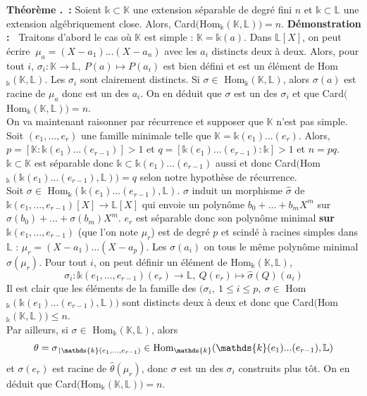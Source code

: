 \documentclass[5pt,a4paper]{article}
\newcounter{thm}[section]
\renewcommand{\thethm}{\thesection.\arabic{thm}}
\newcommand{\thm}[1]{\stepcounter{thm}\noindent\textbf{Théorème \thethm ~:} #1 \newline}
\newcommand{\demo}[1]{\textbf{Démonstration :~} #1 \newline}
\def\restriction#1#2{\mathchoice
              {\setbox1\hbox{${\displaystyle #1}_{\scriptstyle #2}$}
              \restrictionaux{#1}{#2}}
              {\setbox1\hbox{${\textstyle #1}_{\scriptstyle #2}$}
              \restrictionaux{#1}{#2}}
              {\setbox1\hbox{${\scriptstyle #1}_{\scriptscriptstyle #2}$}
              \restrictionaux{#1}{#2}}
              {\setbox1\hbox{${\scriptscriptstyle #1}_{\scriptscriptstyle #2}$}
              \restrictionaux{#1}{#2}}}
\def\restrictionaux#1#2{{#1\,\smash{\vrule height .8\ht1 depth .85\dp1}}_{\,#2}}
\begin{document}
\begin{onehalfspacing}
\thm{Soient $\mathds{k} \subset \mathbb{K}$ une extension séparable de degré fini $n$ et $\mathds{k} \subset \mathbb{L}$ une extension algébriquement close. Alors, Card$($Hom$_{\mathds{k}}(\mathbb{K}, \mathbb{L})) = n$.}
\demo{Traitons d'abord le cas où $\mathbb{K}$ est simple : $\mathbb{K} = \mathds{k}(a)$. Dans $\mathbb{L}[X]$, on peut écrire $~\mu_a = (X - a_1)...(X - a_n)$ avec les $a_i$ distincts deux à deux. Alors, pour tout $i$, $\sigma_i : \mathbb{K} \rightarrow \mathbb{L},~P(a) \mapsto P(a_i)$ est bien défini et est un élément de Hom$_{\mathds{k}}(\mathbb{K}, \mathbb{L})$. Les $\sigma_i$ sont clairement distincts. Si $\sigma \in $ Hom$_{\mathds{k}}(\mathbb{K}, \mathbb{L})$, alors $\sigma(a)$ est racine de $\mu_a$ donc est un des $a_i$. On en déduit que $\sigma$ est un des $\sigma_i$ et que Card$($Hom$_{\mathds{k}}(\mathbb{K}, \mathbb{L})) = n$. 
\\On va maintenant raisonner par récurrence et supposer que $\mathbb{K}$ n'est pas simple. Soit $(e_1, ..., e_r)$ une famille minimale telle que $\mathbb{K} = \mathds{k}(e_1)...(e_r)$. Alors, $p = [\mathbb{K} : \mathds{k}(e_1)...(e_{r-1})] > 1$ et $q = [\mathds{k}(e_1)...(e_{r-1}) : \mathds{k}] > 1$ et $n = pq$. 
\\$\mathds{k} \subset \mathbb{K}$ est séparable donc $\mathds{k} \subset \mathds{k}(e_1)...(e_{r-1})$ aussi et donc Card$($Hom$_{\mathds{k}}(\mathds{k}(e_1)...(e_{r-1}), \mathbb{L})) = q$ selon notre hypothèse de récurrence. 
\\Soit $\sigma \in $ Hom$_{\mathds{k}}(\mathds{k}(e_1)...(e_{r-1}), \mathbb{L})$. $\sigma$ induit un morphisme $\hat{\sigma}$ de $\mathds{k}(e_1, ..., e_{r-1})[X] \rightarrow \mathbb{L}[X]$ qui envoie un polynôme $b_0 + ... + b_mX^m$ sur $\sigma(b_0) + ... + \sigma(b_m)X^m$. $e_r$ est séparable donc son polynôme minimal \textbf{sur $\mathds{k}(e_1, ..., e_{r-1})$} (que l'on note $\mu_r$) est de degré $p$ et scindé à racines simples dans $\mathbb{L}$ : $\mu_r = (X - a_1)...(X - a_p)$. Les $\sigma(a_i)$ on tous le même polynôme minimal $\hat{\sigma}(\mu_r)$. Pour tout $i$, on peut définir un élément de Hom$_{\mathds{k}}(\mathbb{K}, \mathbb{L})$,
\[ \sigma_i : \mathds{k}(e_1, ..., e_{r-1})(e_r) \rightarrow \mathbb{L},~Q(e_r) \mapsto \hat{\sigma}(Q)(a_i)\]
Il est clair que les éléments de la famille des $(\sigma_i,~1 \leq i \leq p,~\sigma \in $ Hom$_{\mathds{k}}(\mathds{k}(e_1)...(e_{r-1}), \mathbb{L}))$ sont distincts deux à deux et donc que Card$($Hom$_{\mathds{k}}(\mathbb{K}, \mathbb{L})) \leq n$. 
\\Par ailleurs, si $\sigma \in$ Hom$_{\mathds{k}}(\mathbb{K}, \mathbb{L})$, alors 
\[ \theta = \restriction{\sigma}{\mathds{k}(e_1, ..., e_{r-1})} \in \textup{Hom}_{\mathds{k}}(\mathds{k}(e_1)...(e_{r-1}), \mathbb{L}) \] 
et $\sigma(e_r)$ est racine de $\hat{\theta}(\mu_r)$, donc $\sigma$ est un des $\sigma_i$ construits plus tôt. On en déduit que Card$($Hom$_{\mathds{k}}(\mathbb{K}, \mathbb{L})) = n$.}



\end{onehalfspacing}
\end{document}
